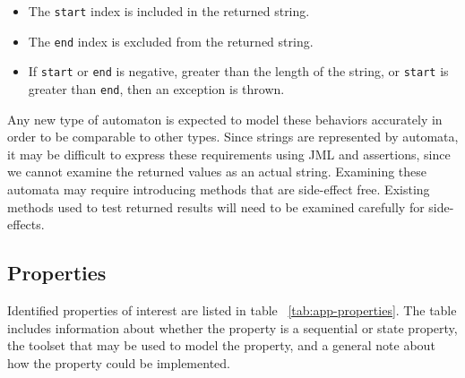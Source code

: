 \documentclass[letterpaper,11pt]{article}
\begin{document}
\begin{itemize}
\item{The \texttt{start} index is included in the returned string.}
\item{The \texttt{end} index is excluded from the returned string.}
\item{If \texttt{start} or \texttt{end} is negative, greater than the length of
    the string, or \texttt{start} is greater than \texttt{end}, then an
    exception is thrown.}
\end{itemize}

Any new type of automaton is expected to model these behaviors accurately in
order to be comparable to other types.  Since strings are represented by
automata, it may be difficult to express these requirements using JML and
assertions, since we cannot examine the returned values as an actual string.
Examining these automata may require introducing methods that are side-effect
free.  Existing methods used to test returned results will need to be examined
carefully for side-effects.

\subsection{Properties}

Identified properties of interest are listed in table
~\ref{tab:app-properties}.  The table includes information about whether the
property is a sequential or state property, the toolset that may be used to
model the property, and a general note about how the property could be
implemented.
\end{document}
